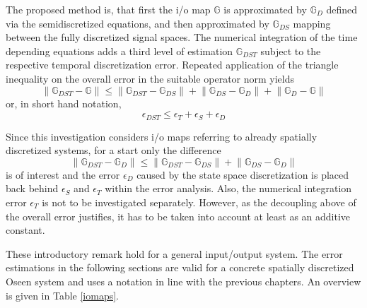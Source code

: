 \documentclass[a4paper,10pt,BCOR=15mm]{scrbook}
\providecommand{\norm}[1]{\lVert#1 \rVert}
\begin{document}
The proposed method is, that first the i/o map $\mathbb G$ is approximated by $\mathbb G_D$ defined via the semidiscretized equations, and then approximated by $\mathbb G_{DS}$ mapping between the fully discretized signal spaces. The numerical integration of the time depending equations adds a third level of estimation $\mathbb G_{DST}$ subject to the respective temporal discretization error. Repeated application of the triangle inequality on the overall error in the suitable operator norm yields
\begin{equation}\label{erdec}
 \norm{\mathbb G_{DST}-\mathbb G} \leq  \norm{\mathbb G_{DST}-\mathbb G_{DS}} +  \norm{\mathbb  G_{DS}-\mathbb G_{D}} +\norm{\mathbb G_{D}-\mathbb G} 
\end{equation}
or, in short hand notation,
\begin{equation*}
 \epsilon_{DST} \leq \epsilon_T + \epsilon_S + \epsilon_D
\end{equation*}

Since this investigation considers i/o maps referring to already spatially discretized systems, for a start only the difference  
\begin{equation*}
 \norm{\mathbb G_{DST}-\mathbb G_D} \leq  \norm{\mathbb G_{DST}-\mathbb G_{DS}} +  \norm{\mathbb  G_{DS}-\mathbb G_{D}} 
\end{equation*}
is of interest and the error $\epsilon_D$ caused by the state space discretization is placed back behind $\epsilon_S$ and $\epsilon_T$ within the error analysis. Also, the numerical integration error $\epsilon_T$ is not to be investigated separately. However, as the decoupling above of the overall error justifies, it has to be taken into account at least as an additive constant. 

These introductory remark hold for a general input/output system. The error estimations in the following sections are valid for a concrete spatially discretized Oseen system and uses a notation in line with the previous chapters. An overview is given in Table \ref{iomaps}.
\end{document}
